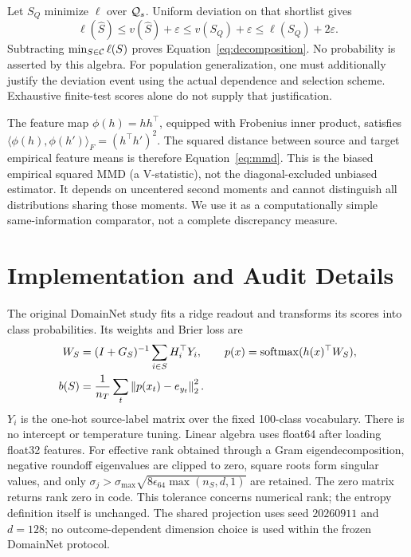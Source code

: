 Let $S_Q$ minimize $\ell$ over $\mathcal{Q}_s$. Uniform deviation on that shortlist gives
\begin{equation}
 \ell(\widehat S)\leq v(\widehat S)+\varepsilon
 \leq v(S_Q)+\varepsilon\leq\ell(S_Q)+2\varepsilon.
\end{equation}
Subtracting $\min_{S\in\mathcal{C}}\ell(S)$ proves Equation~\eqref{eq:decomposition}. No probability is asserted by this algebra. For population generalization, one must additionally justify the deviation event using the actual dependence and selection scheme. Exhaustive finite-test scores alone do not supply that justification.

The feature map $\phi(h)=hh^\top$, equipped with Frobenius inner product, satisfies $\langle\phi(h),\phi(h')\rangle_F=(h^\top h')^2$. The squared distance between source and target empirical feature means is therefore Equation~\eqref{eq:mmd}. This is the biased empirical squared MMD (a V-statistic), not the diagonal-excluded unbiased estimator. It depends on uncentered second moments and cannot distinguish all distributions sharing those moments. We use it as a computationally simple same-information comparator, not a complete discrepancy measure.

\section{Implementation and Audit Details}
\label{app:protocol}
The original DomainNet study fits a ridge readout and transforms its scores into class probabilities. Its weights and Brier loss are
\begin{equation}
 \begin{aligned}
 W_S&=(I+G_S)^{-1}\sum_{i\in S}H_i^\top Y_i,\qquad
 p(x)=\operatorname{softmax}(h(x)^\top W_S),\\
 b(S)&=\frac1{n_T}\sum_t\left\lVert p(x_t)-e_{y_t}\right\rVert_2^2.
 \end{aligned}
\end{equation}
$Y_i$ is the one-hot source-label matrix over the fixed 100-class vocabulary. There is no intercept or temperature tuning. Linear algebra uses float64 after loading float32 features. For effective rank obtained through a Gram eigendecomposition, negative roundoff eigenvalues are clipped to zero, square roots form singular values, and only $\sigma_j>\sigma_{\max}\sqrt{8\epsilon_{64}\max(n_S,d,1)}$ are retained. The zero matrix returns rank zero in code. This tolerance concerns numerical rank; the entropy definition itself is unchanged. The shared projection uses seed $20260911$ and $d=128$; no outcome-dependent dimension choice is used within the frozen DomainNet protocol.

